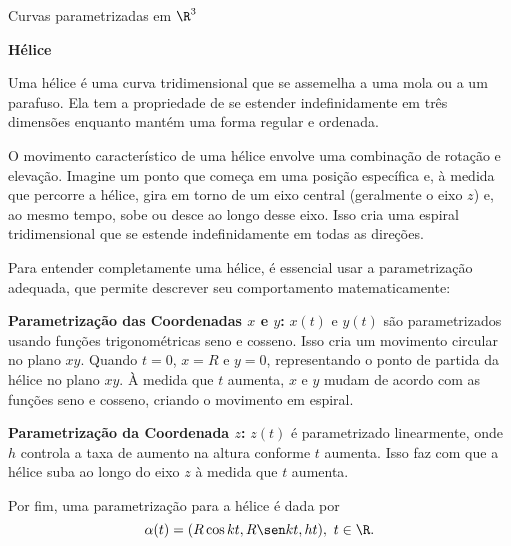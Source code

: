 \begin{examples}{Curvas parametrizadas em $\R^3$}{}
\begin{center}
\end{center}



\textbf{Hélice}


Uma hélice é uma curva tridimensional que se assemelha a uma mola ou a um parafuso. Ela tem a propriedade de se estender indefinidamente em três dimensões enquanto mantém uma forma regular e ordenada. 

O movimento característico de uma hélice envolve uma combinação de rotação e elevação. Imagine um ponto que começa em uma posição específica e, à medida que percorre a hélice, gira em torno de um eixo central (geralmente o eixo \(z\)) e, ao mesmo tempo, sobe ou desce ao longo desse eixo. Isso cria uma espiral tridimensional que se estende indefinidamente em todas as direções.


Para entender completamente uma hélice, é essencial usar a parametrização adequada, que permite descrever seu comportamento matematicamente: 

\textbf{Parametrização das Coordenadas \(x\) e \(y\):} \(x(t)\) e \(y(t)\) são parametrizados usando funções trigonométricas seno e cosseno. Isso cria um movimento circular no plano \(xy\). Quando \(t = 0\), \(x = R\) e \(y = 0\), representando o ponto de partida da hélice no plano \(xy\). À medida que \(t\) aumenta, \(x\) e \(y\) mudam de acordo com as funções seno e cosseno, criando o movimento em espiral.

\textbf{Parametrização da Coordenada \(z\):}
   \(z(t)\) é parametrizado linearmente, onde \(h\) controla a taxa de aumento na altura conforme \(t\) aumenta. Isso faz com que a hélice suba ao longo do eixo \(z\) à medida que \(t\) aumenta.



Por fim, uma parametrização para a hélice é dada por
$$\alpha(t)=(R\cos kt, R\sen kt,ht),~t\in\R.$$



\end{examples}
